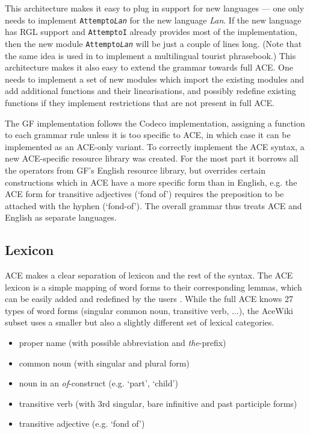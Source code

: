\documentclass[a4paper]{article}
\begin{document}
This architecture makes it easy to plug in support for new languages ---
one only needs to implement \texttt{Attempto\textit{Lan}} for the new language
\textit{Lan}. If the new language has RGL support and \texttt{AttemptoI}
already provides most of the implementation, then
the new module \texttt{Attempto\textit{Lan}} will be just a couple of lines
long.
(Note that the same idea is used in \cite{ranta:cnl2010_revised} to implement
a multilingual tourist phrasebook.)
This architecture makes it also easy to extend the grammar towards full ACE.
One needs to implement a set of new modules which import the existing modules
and add additional functions and their linearisations, and possibly
redefine existing functions if they implement restrictions that are not
present in full ACE.

The GF implementation follows the Codeco implementation, assigning a function
to each grammar rule unless it is too specific to ACE, in which case it
can be implemented as an ACE-only variant.
To correctly implement the ACE syntax, a new ACE-specific resource library
was created. For the most part it borrows all the operators from GF's English
resource library, but overrides certain constructions which in ACE have a
more specific form than in English, e.g. the ACE form for transitive
adjectives (`fond of') requires the preposition to be attached with
the hyphen (`fond-of'). The overall grammar thus treats ACE and English as
separate languages.

\subsection{Lexicon}

ACE makes a clear separation of lexicon and the rest of the syntax. The ACE
lexicon is a simple mapping of word forms to their corresponding lemmas, which
can be easily added and redefined by the users
\cite{ACE_6.6_Lexicon_Specification}. While the full ACE knows 27 types of
word forms (singular common noun, transitive verb, ...), the AceWiki subset
uses a smaller but also a slightly different set of lexical categories.

\begin{itemize}
\item proper name (with possible abbreviation and \emph{the}-prefix)
\item common noun (with singular and plural form)
\item noun in an \emph{of}-construct (e.g. `part', `child')
\item transitive verb (with 3rd singular, bare infinitive and past participle
forms)
\item transitive adjective (e.g. `fond of')
\end{itemize}
\end{document}
